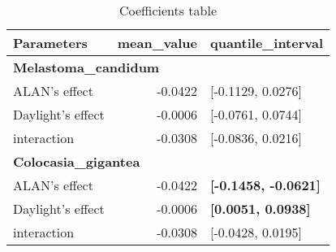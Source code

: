 \documentclass[
]{article}
\begin{document}
\begin{table}

\caption{\label{tab:unnamed-chunk-23}Coefficients table}
\centering
\begin{tabular}[t]{l|r|>{}l}
\hline
Parameters & mean\_value & quantile\_interval\\
\hline
\multicolumn{3}{l}{\textbf{Melastoma\_candidum}}\\
\hline
\hspace{1em}ALAN's effect & -0.0422 & [-0.1129, 0.0276]\\
\hline
\hspace{1em}Daylight's effect & -0.0006 & [-0.0761, 0.0744]\\
\hline
\hspace{1em}interaction & -0.0308 & [-0.0836, 0.0216]\\
\hline
\multicolumn{3}{l}{\textbf{Colocasia\_gigantea}}\\
\hline
\hspace{1em}ALAN's effect & -0.0422 & \textbf{[-0.1458, -0.0621]}\\
\hline
\hspace{1em}Daylight's effect & -0.0006 & \textbf{[0.0051, 0.0938]}\\
\hline
\hspace{1em}interaction & -0.0308 & [-0.0428, 0.0195]\\
\hline
\end{tabular}
\end{table}
\end{document}
